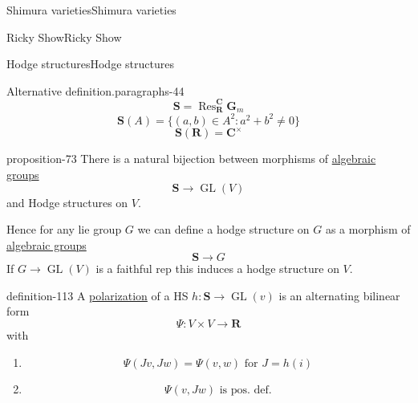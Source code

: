 \documentclass[10pt,]{book}
\numberwithin{equation}{section}
\newcommand{\RR}{\mathbf{R}}
\newcommand{\CC}{\mathbf{C}}
\DeclareMathOperator{\Res}{Res}
\DeclareMathOperator{\GL}{GL}
\begin{document}
\begin{chapterptx}{Shimura varieties}{}{Shimura varieties}{}{}
\begin{sectionptx}{Ricky Show}{}{Ricky Show}{}{}
\begin{subsectionptx}{Hodge structures}{}{Hodge structures}{}{}
\begin{paragraphs}{Alternative definition.}{paragraphs-44}%
\hypertarget{p-1148}{}%
%
\begin{equation*}
\mathbf S = \Res_\RR^\CC \mathbf G_m
\end{equation*}
%
\begin{equation*}
\mathbf S(A) = \{ (a,b) \in A^2 : a^2+  b^2 \ne 0\}
\end{equation*}
%
\begin{equation*}
\mathbf S(\RR) = \CC^\times
\end{equation*}
%
\begin{proposition}{}{}{proposition-73}%
\hypertarget{p-1149}{}%
There is  a natural bijection between morphisms of \hyperref[def-alg-gp]{algebraic groups}%
\begin{equation*}
\mathbf S \to \GL(V)
\end{equation*}
and Hodge structures on \(V\).%
\end{proposition}
\hypertarget{p-1150}{}%
Hence for any lie group \(G\) we can define a hodge structure on \(G\) as a morphism of \hyperref[def-alg-gp]{algebraic groups}%
\begin{equation*}
\mathbf S \to G
\end{equation*}
If \(G \to \GL(V)\) is a faithful rep this induces a hodge structure on \(V\).%
\begin{definition}{}{definition-113}%
\hypertarget{p-1151}{}%
A \hyperref[def-polarization]{polarization} of a HS \(h\colon \mathbf S \to \GL(v)\) is an alternating bilinear form%
\begin{equation*}
\Psi \colon V\times V \to \RR
\end{equation*}
with\leavevmode%
\begin{enumerate}
\item\hypertarget{li-281}{}%
\begin{equation*}
\Psi (Jv,Jw) =  \Psi(v,w) \text{ for } J = h(i)
\end{equation*}
%
\item\hypertarget{li-282}{}%
\begin{equation*}
\Psi(v,Jw) \text{ is pos. def.}
\end{equation*}
%
\end{enumerate}
%
\end{definition}
\end{paragraphs}%
\end{subsectionptx}
\end{sectionptx}
\end{chapterptx}
\end{document}
